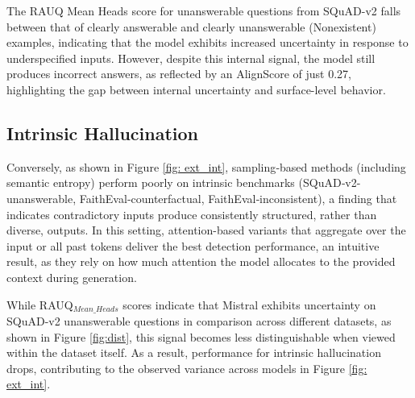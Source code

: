 \documentclass[letterpaper]{article} %
\begin{document}
The RAUQ Mean Heads score for unanswerable questions from SQuAD-v2 falls between that of clearly answerable and clearly unanswerable (Nonexistent) examples, indicating that the model exhibits increased uncertainty in response to underspecified inputs. However, despite this internal signal, the model still produces incorrect answers, as reflected by an AlignScore of just 0.27, highlighting the gap between internal uncertainty and surface-level behavior.
\subsection{Intrinsic Hallucination}
Conversely, as shown in Figure \ref{fig: ext_int}, sampling‑based methods (including semantic entropy) perform poorly on intrinsic benchmarks (SQuAD‑v2-unanswerable, FaithEval‑counterfactual, FaithEval‑inconsistent), a finding that indicates contradictory inputs produce consistently structured, rather than diverse, outputs. In this setting, attention-based variants that aggregate over the input or all past tokens deliver the best detection performance, an intuitive result, as they rely on how much attention the model allocates to the provided context during generation.

While RAUQ$_{Mean\_Heads}$ scores indicate that Mistral exhibits uncertainty on SQuAD-v2 unanswerable questions in comparison across different datasets, as shown in Figure \ref{fig:dist}, this signal becomes less distinguishable when viewed within the dataset itself. As a result, performance for intrinsic hallucination drops, contributing to the observed variance across models in Figure \ref{fig: ext_int}.
\end{document}
